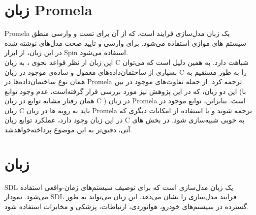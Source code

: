 
\section{زبان Promela}
Promela \cite{4} یک زبان مدل‌سازی فرایند است، که از آن برای تست و وارسی منطق سیستم های موازی استفاده می‌شود. برای وارسی و تایید صحت مدل‌های نوشته شده در این زبان، از ابزار Spin استفاده می‌شود.
\\
این زبان از نظر قواعد نحوی ، به زبان C شباهت‌ دارد. به همین دلیل است که می‌توان بسیاری از ساختمان‌داده‌های  معمول و ساده‌ی موجود در زبان C را به طور مستقیم به همان نوع ساختمان‌داده‌ها در Promela ترجمه کرد. از جمله تفاوت‌های موجود در بین این دو زبان، که در این پژوهش نیز مورد بررسی قرار گرفته‌است، عدم وجود توابع   (با همان رفتار مشابه توابع در زبان C ) در زبان Promela است. بنابراین، توابع موجود در زبان C باید به رویه‌  ها در زبان Promela ترجمه شوند و با استفاده از امکانات دیگری که در این زبان وجود دارد، عملکرد توابع زبان C به خوبی شبیه‌سازی شود. در بخش های آتی، دقیق‌تر به این موضوع پرداخته‌خواهدشد.

\section{زبان } 
SDL یک زبان مدل‌سازی است که برای توصیف سیستم‌های زمان-واقعی استفاده می‌شود. نمودار SDL فرایند مدل‌سازی را نشان می‌دهد. این زبان می‌تواند به طور گسترده‌ در سیستم‌های خودرو، هوانوردی، ارتباطات، پزشکی و مخابرات استفاده شود.

